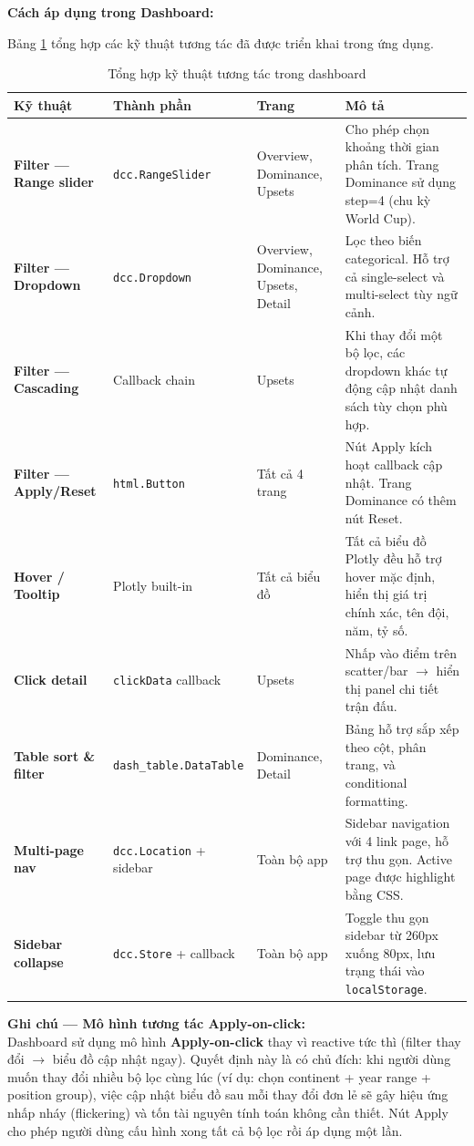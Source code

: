 \documentclass[12pt,a4paper]{article}
\begin{document}
\textbf{Cách áp dụng trong Dashboard:}

Bảng \ref{tab:interaction_techniques} tổng hợp các kỹ thuật tương tác đã được triển khai trong ứng dụng.

\begin{table}[H]
\centering
\caption{Tổng hợp kỹ thuật tương tác trong dashboard}
\label{tab:interaction_techniques}
\begin{tabular}{lllp{6.5cm}}
\toprule
\textbf{Kỹ thuật} & \textbf{Thành phần} & \textbf{Trang} & \textbf{Mô tả} \\
\midrule
\textbf{Filter --- Range slider} & \texttt{dcc.RangeSlider} & Overview, Dominance, Upsets & Cho phép chọn khoảng thời gian phân tích. Trang Dominance sử dụng step=4 (chu kỳ World Cup). \\
\textbf{Filter --- Dropdown} & \texttt{dcc.Dropdown} & Overview, Dominance, Upsets, Detail & Lọc theo biến categorical. Hỗ trợ cả single-select và multi-select tùy ngữ cảnh. \\
\textbf{Filter --- Cascading} & Callback chain & Upsets & Khi thay đổi một bộ lọc, các dropdown khác tự động cập nhật danh sách tùy chọn phù hợp. \\
\textbf{Filter --- Apply/Reset} & \texttt{html.Button} & Tất cả 4 trang & Nút Apply kích hoạt callback cập nhật. Trang Dominance có thêm nút Reset. \\
\textbf{Hover / Tooltip} & Plotly built-in & Tất cả biểu đồ & Tất cả biểu đồ Plotly đều hỗ trợ hover mặc định, hiển thị giá trị chính xác, tên đội, năm, tỷ số. \\
\textbf{Click detail} & \texttt{clickData} callback & Upsets & Nhấp vào điểm trên scatter/bar $\rightarrow$ hiển thị panel chi tiết trận đấu. \\
\textbf{Table sort \& filter} & \texttt{dash\_table.DataTable} & Dominance, Detail & Bảng hỗ trợ sắp xếp theo cột, phân trang, và conditional formatting. \\
\textbf{Multi-page nav} & \texttt{dcc.Location} + sidebar & Toàn bộ app & Sidebar navigation với 4 link page, hỗ trợ thu gọn. Active page được highlight bằng CSS. \\
\textbf{Sidebar collapse} & \texttt{dcc.Store} + callback & Toàn bộ app & Toggle thu gọn sidebar từ 260px xuống 80px, lưu trạng thái vào \texttt{localStorage}. \\
\bottomrule
\end{tabular}
\end{table}

\textbf{Ghi chú --- Mô hình tương tác Apply-on-click:} \\
Dashboard sử dụng mô hình \textbf{Apply-on-click} thay vì reactive tức thì (filter thay đổi $\rightarrow$ biểu đồ cập nhật ngay). Quyết định này là có chủ đích: khi người dùng muốn thay đổi nhiều bộ lọc cùng lúc (ví dụ: chọn continent + year range + position group), việc cập nhật biểu đồ sau mỗi thay đổi đơn lẻ sẽ gây hiệu ứng nhấp nháy (flickering) và tốn tài nguyên tính toán không cần thiết. Nút Apply cho phép người dùng cấu hình xong tất cả bộ lọc rồi áp dụng một lần.
\end{document}
